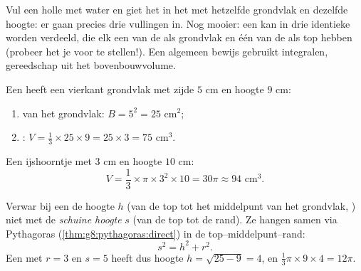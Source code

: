 \begin{remark}
Vul een holle  met water en giet het in het  met hetzelfde
grondvlak en dezelfde hoogte: er gaan precies drie vullingen in. Nog mooier: een
 kan in drie identieke  worden verdeeld, die elk een  van de
 als grondvlak en één  van de  als top hebben (probeer het je
voor te stellen!). Een algemeen bewijs gebruikt integralen, gereedschap uit het
bovenbouwvolume.
\end{remark}

\begin{example}\label{ex:g8:solids:volume}
Een  heeft een vierkant grondvlak met zijde $5$ cm en hoogte $9$ cm:
\begin{enumerate}
  \item {} van het grondvlak: $B = 5^2 = 25$ cm$^2$;
  \item {}: $V = \frac13 \times 25 \times 9 = 25 \times 3 = 75$ cm$^3$.
\end{enumerate}
Een ijshoorntje met  $3$ cm en hoogte $10$ cm:
\[
V = \frac13 \times \pi \times 3^2 \times 10 = 30\pi \approx 94
\text{ cm}^3 .
\]
\end{example}

\begin{example}\label{ex:g8:solids:slant}
Verwar bij een  de hoogte $h$ (van de top tot het middelpunt van het
grondvlak, ) niet met de \emph{schuine hoogte} $s$ (van de top tot de
rand). Ze hangen samen via Pythagoras (\cref{thm:g8:pythagoras:direct}) in de
 top--middelpunt--rand:
\[
s^2 = h^2 + r^2 .
\]
Een  met $r = 3$ en $s = 5$ heeft dus hoogte $h = \sqrt{25 - 9} = 4$, en
 $\frac13 \pi \times 9 \times 4 = 12\pi$.
\end{example}

